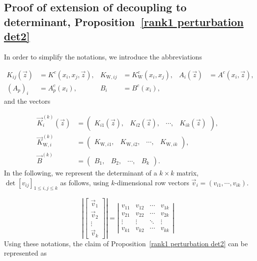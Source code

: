 \documentclass[cmp]{svjour}
\numberwithin{theorem}{section}
\numberwithin{equation}{section}
\begin{document}
\subsection{Proof of extension of decoupling to determinant, Proposition~\ref{rank1 perturbation det2}}
\label{ap:rank1_determinant}

In order to simplify the notations, we introduce the abbreviations

\begin{align*}
K_{ij}(\vec{z}) & = K^c(x_i , x_j, \vec{z}), & K_{{\mathrm{W}},ij} & = K^c_{\mathrm{W}}(x_i , x_j), & A_i(\vec{z}) & = A^c(x_i, \vec{z}), \\
{(A_p)}_i & = A^c_p(x_i), & B_i & = B^c(x_i),
\end{align*}
and the vectors

\begin{align*}
\vec{K}^{(k)}_{i}(\vec{z}) &= \left(
\begin{array}{cccc}
K_{i1}(\vec{z}), & K_{i2}(\vec{z}), & \cdots , & K_{ik}(\vec{z})
\end{array}
\right) ,\\
\vec{K}^{(k)}_{{\mathrm{W}},i} & = \left(
\begin{array}{cccc}
K_{\mathrm{W},i1}, & K_{\mathrm{W},i2}, & \cdots , & K_{\mathrm{W},ik}
\end{array}
\right), \\
\vec{B}^{(k)} &= \left(
\begin{array}{cccc}
B_{1}, & B_{2}, & \cdots , & B_{k}
\end{array}
\right). 
\end{align*}
In the following, we represent the determinant of a $k \times k$ matrix, $\det[v_{ij}]_{1 \leq i , j \leq k}$ as follows, using $k$-dimensional row vectors $\vec{v}_i = (v_{i1}, \cdots, v_{ik})$. 

\begin{equation*}
\left|
\left[
\begin{array}{c}
\vec{v}_1  \\
\vec{v}_2  \\
\vdots \\
\vec{v}_k 
\end{array}
\right]
\right| = 
\left|
\begin{array}{cccc}
v_{11} & v_{12} & \cdots & v_{1k}  \\
v_{21} & v_{22} & \cdots & v_{2k}  \\
\vdots & \vdots & \ddots & \vdots \\
v_{k1} & v_{k2} & \cdots & v_{kk}
\end{array}
\right|
\end{equation*}
Using these notations, the claim of Proposition~\ref{rank1 perturbation det2} can be represented as
\end{document}
